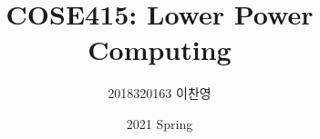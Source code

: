 

\title{COSE415: Lower Power Computing}
\author{2018320163 이찬영}
\date{2021 Spring}


    \maketitle
    \tableofcontents
    
    
    
    
    


